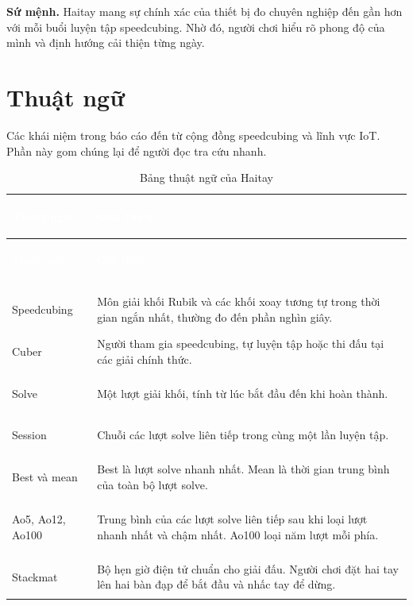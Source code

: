 \textbf{Sứ mệnh.} Haitay mang sự chính xác của thiết bị đo chuyên nghiệp đến gần hơn với mỗi buổi luyện tập speedcubing. Nhờ đó, người chơi hiểu rõ phong độ của mình và định hướng cải thiện từng ngày.


\section{Thuật ngữ}
Các khái niệm trong báo cáo đến từ cộng đồng speedcubing và lĩnh vực IoT. Phần này gom chúng lại để người đọc tra cứu nhanh.

{\small\renewcommand{\arraystretch}{1.25}%
\begin{longtable}{>{\bfseries\raggedright\arraybackslash}m{3.8cm} >{\raggedright\arraybackslash}m{11cm}}
        \caption{Bảng thuật ngữ của Haitay}\label{tab:glossary}\\
        \toprule
        \rowcolor{haitayblue}
        \textcolor{white}{Thuật ngữ} & \textcolor{white}{Giải thích} \\
        \midrule
        \endfirsthead
        \toprule
        \rowcolor{haitayblue}
        \textcolor{white}{Thuật ngữ} & \textcolor{white}{Giải thích} \\
        \midrule
        \endhead
        \midrule
        \multicolumn{2}{r}{\itshape\small Tiếp theo trang sau} \\
        \endfoot
        \bottomrule
        \endlastfoot
        \rowcolor{haitayblue!8}
        \multicolumn{2}{l}{\textcolor{haitayblue}{\textbf{Speedcubing và cộng đồng}}} \\
        Speedcubing & Môn giải khối Rubik và các khối xoay tương tự trong thời gian ngắn nhất, thường đo đến phần nghìn giây. \\
        Cuber & Người tham gia speedcubing, tự luyện tập hoặc thi đấu tại các giải chính thức. \\
        Solve & Một lượt giải khối, tính từ lúc bắt đầu đến khi hoàn thành. \\
        Session & Chuỗi các lượt solve liên tiếp trong cùng một lần luyện tập. \\
        Best và mean & Best là lượt solve nhanh nhất. Mean là thời gian trung bình của toàn bộ lượt solve. \\
        Ao5, Ao12, Ao100 & Trung bình của các lượt solve liên tiếp sau khi loại lượt nhanh nhất và chậm nhất. Ao100 loại năm lượt mỗi phía. \\
        Stackmat & Bộ hẹn giờ điện tử chuẩn cho giải đấu. Người chơi đặt hai tay lên hai bàn đạp để bắt đầu và nhấc tay để dừng. \\

\end{longtable}}
